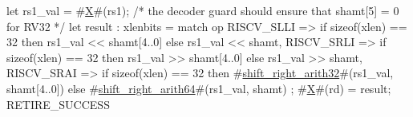 let rs1_val = #\hyperref[sailRISCVzX]{X}#(rs1);
/* the decoder guard should ensure that shamt[5] = 0 for RV32 */
let result : xlenbits = match op {
  RISCV_SLLI => if   sizeof(xlen) == 32
                then rs1_val << shamt[4..0]
                else rs1_val << shamt,
  RISCV_SRLI => if   sizeof(xlen) == 32
                then rs1_val >> shamt[4..0]
                else rs1_val >> shamt,
  RISCV_SRAI => if   sizeof(xlen) == 32
                then #\hyperref[sailRISCVzshiftzyrightzyarith32]{shift\_right\_arith32}#(rs1_val, shamt[4..0])
                else #\hyperref[sailRISCVzshiftzyrightzyarith64]{shift\_right\_arith64}#(rs1_val, shamt)
};
#\hyperref[sailRISCVzX]{X}#(rd) = result;
RETIRE_SUCCESS
